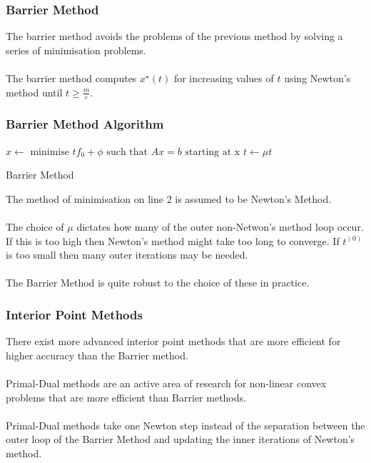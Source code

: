 \documentclass{beamer}
\begin{document}
\begin{frame}
    \frametitle{Barrier Method}
    The barrier method avoids the problems of the previous method by solving a
    series of minimisation problems.
    \\~\\
    The barrier method computes $x^{\star}(t)$ for increasing values of
    $t$ using Newton's method until $t \geq \frac{m}{\varepsilon}$.
\end{frame}


\begin{frame}
    \frametitle{Barrier Method Algorithm}
    \begin{algorithm}[H]
        \begin{algorithmic}[1]
            \STATE $x \leftarrow \text{ minimise } tf_{0} + \phi
            \text{ such that } Ax = b \text{ starting at x}$
            \STATE $t \leftarrow \mu t$
            \ENDWHILE
        \end{algorithmic}
        \caption{Barrier Method}
        \label{alg:seq}
    \end{algorithm}
    The method of minimisation on line 2 is assumed to be Newton's Method.
    \\~\\
    The choice of $\mu$ dictates how many of the outer non-Netwon's method loop
    occur. If this is too high then Newton's method might take too long to
    converge. If $t^{(0)}$ is too small then many outer iterations may be
    needed.
    \\~\\
    The Barrier Method is quite robust to the choice of these in practice.
\end{frame}


\begin{frame}
    \frametitle{Interior Point Methods}
    There exist more advanced interior point methods that are more efficient
    for higher accuracy than the Barrier method.
    \\~\\
    Primal-Dual methods are an active area of research for non-linear convex
    problems that are more efficient than Barrier methods.
    \\~\\
    Primal-Dual methods take one Newton step instead of the separation between
    the outer loop of the Barrier Method and updating the inner iterations of
    Newton's method.
\end{frame}
\end{document}
